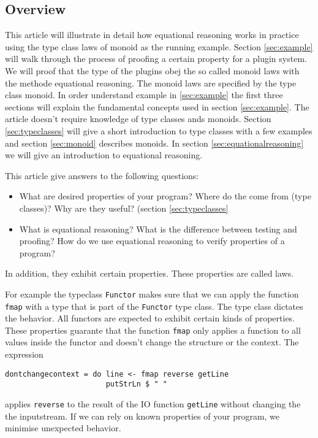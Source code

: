 \subsection{Overview}

This article will illustrate in detail how equational reasoning works in practice using the type class laws of monoid as the running example. Section \ref{sec:example} will walk through the process of proofing a certain property for a plugin system. We will proof that the type of the plugins obej the so called monoid laws with the methode equational reasoning.  The monoid laws are specified by the type class monoid. In order understand  example in \ref{sec:example} the first three sections will explain the fundamental concepts used in section \ref{sec:example}. The article doesn't require knowledge of type classes ands monoids. 
Section \ref{sec:typeclasses} will give a short introduction to type classes with a few examples and section \ref{sec:monoid} describes monoids. In section \ref{sec:equationalreasoning} we will give an introduction to equational reasoning.

This article give answers to the following questions:
\begin{itemize}
\item What are desired properties of your program? Where do the come from (type classes)? Why are they useful? (section \ref{sec:typeclasses}
\item What is equational reasoning? What is the difference between testing and proofing? How do we use equational reasoning to verify properties of a program?
\end{itemize}


 In addition, they exhibit certain properties. These properties are called laws. 


For example the typeclass \verb|Functor| makes sure that we can apply the function \verb|fmap| with a type that is part of the \verb|Functor| type class. The type class dictates the behavior. All functors are expected to exhibit certain kinds of properties. These properties guarante that the function \verb|fmap| only applies a function to all values inside the functor and doesn't change the structure or the context. The expression
\begin{verbatim}
dontchangecontext = do line <- fmap reverse getLine
                       putStrLn $ " "
\end{verbatim}
applies \verb|reverse| to the result of the IO function \verb|getLine| without changing the the inputstream. 
If we can rely on known properties of your program, we minimise unexpected behavior.

